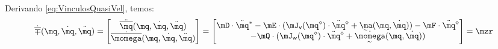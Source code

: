 \documentclass[]{politex}
\begin{document}
Derivando \eqref{eq:VinculosQuasiVel}, temos:
\begin{equation} \label{eq:VinculosQuasiAce}
\dot{\overline{\mp}}(\mq,\dot{\mq},\ddot{\mq}) =
\begin{bmatrix}
\ddot{\overline{\mq}}(\mq,\dot{\mq},\ddot{\mq}) \\
\dot{\overline{\momega}}(\mq,\dot{\mq},\ddot{\mq})
\end{bmatrix}
= 
\begin{bmatrix}
\mD \cdot \ddot{\mq}^\ast - \mE \cdot (\mJ_{\mathsf{v}}(\mq^\diamond) \cdot \ddot{\mq}^\diamond + \underaccent{\sim}{\ma}(\mq, \dot{\mq}))  - \mF \cdot \ddot{\mq}^\diamond \\
- \mQ \cdot (\mJ_{\mathsf{w}}(\mq^\diamond) \cdot \ddot{\mq}^\diamond + \underaccent{\sim}{ \dot{\momega} }(\mq, \dot{\mq}))
\end{bmatrix}
=
\mzr
\end{equation}
\end{document}
